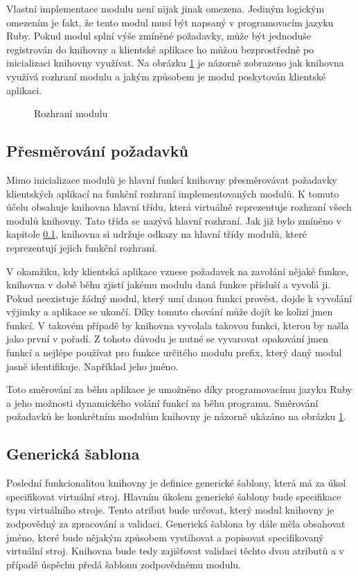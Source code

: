 Vlastní implementace modulu není nijak jinak omezena. Jediným logickým omezením je fakt, že tento modul musí být napsaný
v programovacím jazyku Ruby. Pokud modul splní výše zmíněné požadavky, může být jednoduše registrován do knihovny a klientské
aplikace ho můžou bezprostředně po inicializaci knihovny využívat. Na obrázku \ref{module:interface} je názorně zobrazeno 
jak knihovna využívá rozhraní modulu a jakým způsobem je modul poskytován klientské aplikaci.
\begin{figure}
    \centering    
    \caption{Rozhraní modulu}
    \label{module:interface}
\end{figure}
\subsection{Přesměrování požadavků}
\label{chapter:implementation:library:interface}
Mimo inicializace modulů je hlavní funkcí knihovny přesměrovávat požadavky klientských aplikací na funkční rozhraní 
implementovaných modulů. K tomuto účelu obsahuje knihovna hlavní třídu, která virtuálně reprezentuje rozhraní všech modulů
knihovny. Tato třída se nazývá hlavní rozhraní. Jak již bylo zmíněno v kapitole \ref{chapter:implementation:library:interface},
knihovna si udržuje odkazy na hlavní třídy modulů, které reprezentují jejich funkční rozhraní.

V okamžiku, kdy klientská aplikace vznese požadavek na zavolání nějaké funkce, knihovna v době běhu zjistí jakému modulu daná
funkce přísluší a vyvolá ji. Pokud neexistuje žádný modul, který umí danou funkci provést, dojde k vyvolání výjimky a aplikace
se ukončí. Díky tomuto chování může dojít ke kolizi jmen funkcí. V takovém případě by knihovna vyvolala takovou funkci, kterou
by našla jako první v pořadí. Z tohoto důvodu je nutné se vyvarovat opakování jmen funkcí a nejlépe používat pro funkce určitého
modulu prefix, který daný modul jasně identifikuje. Například jeho jméno.

Toto směrování za běhu aplikace je umožněno díky programovacímu jazyku Ruby a jeho možnosti dynamického volání funkcí za běhu
programu. Směrování požadavků ke konkrétním modulům knihovny je názorně ukázáno na obrázku \ref{module:interface}.
\subsection{Generická šablona}
\label{chapter:implementation:library:generic}
Poslední funkcionalitou knihovny je definice generické šablony, která má za úkol specifikovat virtuální stroj. Hlavním úkolem
generické šablony bude specifikace typu virtuálního stroje. Tento atribut bude určovat, který modul knihovny je zodpovědný
za zpracování a validaci. Generická šablona by dále měla obsahovat jméno, které bude nějakým způsobem vystihovat a popisovat
specifikovaný virtuální stroj. Knihovna bude tedy zajišťovat validaci těchto dvou atributů a v případě úspěchu předá
šablonu zodpovědnému modulu.

